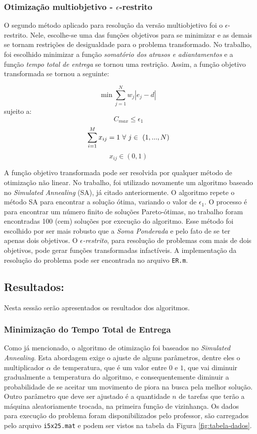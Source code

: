 \documentclass[conference]{IEEEtran}
\begin{document}
\subsubsection{Otimização multiobjetivo - $\epsilon$-restrito}

O segundo método aplicado para resolução da versão multiobjetivo foi o $\epsilon$-restrito. Nele, escolhe-se uma das funções objetivos para se minimizar e as demais se tornam restrições de desigualdade para o problema transformado. No trabalho, foi escolhido minimizar a função \emph{somatório dos atrasos e adiantamentos} e a função \emph{tempo total de entrega} se tornou uma restrição. Assim, a função objetivo transformada se tornou a seguinte:

\[\mathrm{min}\ \sum_{j=1}^{N}w_j|e_j-d| \]
sujeito a:
\begin{equation}
C_{max} \le \epsilon_1
\end{equation}
\begin{equation}
\sum_{i=1}^{M}x_{ij}=1\ \forall\ j \in\ (1,...,N)\\
\label{eq:rest6}
\end{equation}
\[x_{ij} \in (0, 1)\]

A função objetivo transformada pode ser resolvida por qualquer método de otimização não linear. No trabalho, foi utilizado novamente um algoritmo baseado no \emph{Simulated Annealing} (SA), já citado anteriormente. O algoritmo repete o método SA para encontrar a solução ótima, variando o valor de $\epsilon_1$. O processo é para encontrar um número finito de soluções Pareto-ótimas, no trabalho foram encontradas 100 (cem) soluções por execução do algoritmo. Esse método foi escolhido por ser mais robusto que a \emph{Soma Ponderada} e pelo fato de se ter apenas dois objetivos. O \emph{$\epsilon$-restrito}, para resolução de problemas com mais de dois objetivos, pode gerar funções transformadas infactíveis. A implementação da resolução do problema pode ser encontrada no arquivo \texttt{ER.m}.

\subsection{Resultados:}
Nesta sessão serão apresentados os resultados dos algoritmos.
\subsubsection{Minimização do Tempo Total de Entrega}
Como já mencionado, o algoritmo de otimização foi baseados no \textit{Simulated Annealing}. Esta abordagem exige o ajuste de alguns parâmetros, dentre eles o multiplicador $\alpha$ de temperatura, que é um valor entre $0$ e $1$, que vai diminuir gradualmente a temperatura do algoritmo, e consequentemente diminuir a probabilidade de se aceitar um movimento de piora na busca pela melhor solução. Outro parâmetro que deve ser ajustado é a quantidade $n$ de tarefas que terão a máquina aleatoriamente trocada, na primeira função de vizinhança. Os dados para execução do problema foram disponibilizados pelo professor, são carregados pelo arquivo \texttt{i5x25.mat} e podem ser vistos na tabela da Figura \ref{fig:tabela-dados}.
\end{document}
